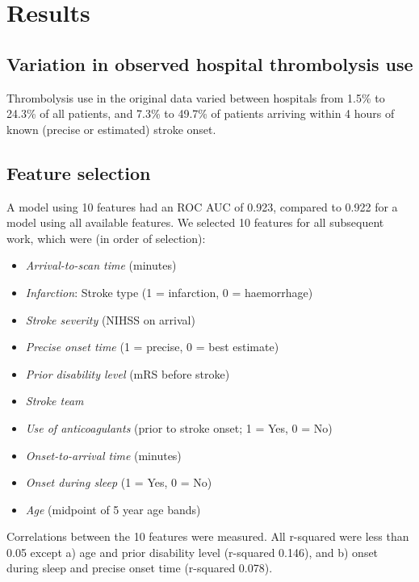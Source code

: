 \section{Results}

\subsection{Variation in observed hospital thrombolysis use}

Thrombolysis use in the original data varied between hospitals from 1.5\% to 24.3\% of all patients, and 7.3\% to 49.7\% of patients arriving within 4 hours of known (precise or estimated) stroke onset.


\subsection{Feature selection}

A model using  10 features had an ROC AUC of 0.923, compared to 0.922 for a model using all available features. We selected 10 features for all subsequent work, which were (in order of selection):

\begin{itemize}
    \item \emph{Arrival-to-scan time} (minutes)
    \item \emph{Infarction}: Stroke type (1 = infarction, 0 = haemorrhage)
    \item \emph{Stroke severity} (NIHSS on arrival)
    \item \emph{Precise onset time} (1 = precise, 0 = best estimate)
    \item \emph{Prior disability level} (mRS before stroke)
    \item \emph{Stroke team}
    \item \emph{Use of anticoagulants} (prior to stroke onset; 1 = Yes, 0 = No)
    \item \emph{Onset-to-arrival time} (minutes)
    \item \emph{Onset during sleep }(1 = Yes, 0 = No)
    \item \emph{Age} (midpoint of 5 year age bands)
\end{itemize}

Correlations between the 10 features were measured. All r-squared were less than 0.05 except a) age and prior disability level (r-squared 0.146), and b) onset during sleep and precise onset time (r-squared 0.078).

